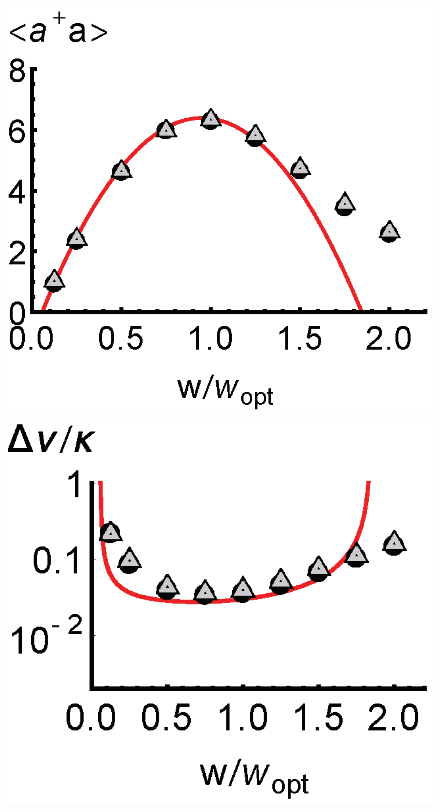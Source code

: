\documentclass[aps,
twocolumn,
showpacs,
superscriptaddress,groupedaddress]{revtex4}
\begin{document}
\begin{figure}
\begin{center}
	\hspace{-5.0mm} \includegraphics[scale =0.38] {N40Superradianceada.eps}
	\hspace{-5.0mm} \includegraphics[scale =0.38] {N40SuperradianceLW.eps}

\end{center}
\end{figure}
\end{document}

